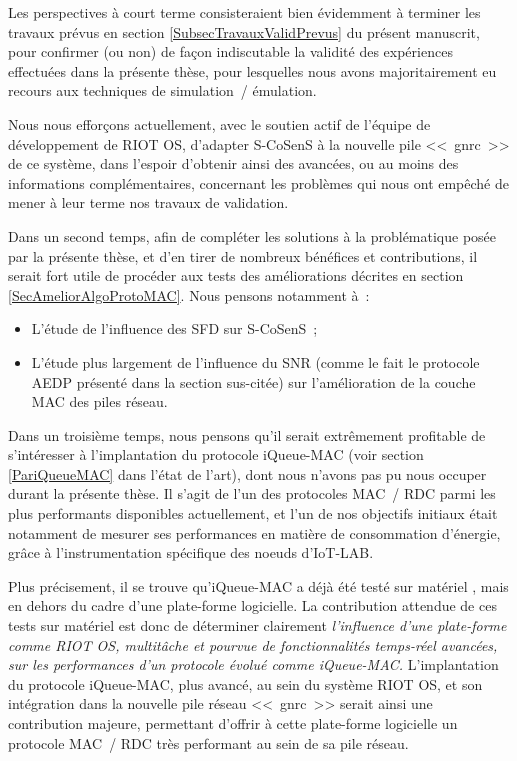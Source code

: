 Les perspectives à court terme consisteraient bien évidemment à terminer
les travaux prévus en section \vref{SubsecTravauxValidPrevus} du présent
manuscrit, pour confirmer (ou non) de façon indiscutable la validité des
expériences effectuées dans la présente thèse, pour lesquelles nous avons
majoritairement eu recours aux techniques de simulation~/ émulation.

Nous nous efforçons actuellement, avec le soutien actif de l'équipe de
développement de RIOT OS, d'adapter S-CoSenS à la nouvelle pile <<~gnrc~>>
de ce système, dans l'espoir d'obtenir ainsi des avancées, ou au moins
des informations complémentaires, concernant les problèmes qui nous ont
empêché de mener à leur terme nos travaux de validation.

\medskip

Dans un second temps, afin de compléter les solutions à la problématique
posée par la présente thèse, et d'en tirer de nombreux bénéfices et
contributions, il serait fort utile de procéder aux tests des améliorations
décrites en section \vref{SecAmeliorAlgoProtoMAC}. Nous pensons notamment à~:

\begin{itemize}

\item L'étude de l'influence des SFD sur S-CoSenS~;

\item L'étude plus largement de l'influence du SNR (comme le fait le
protocole AEDP présenté dans la section sus-citée) sur l'amélioration
de la couche MAC des piles réseau.

\end{itemize}

\medskip

Dans un troisième temps, nous pensons qu'il serait extrêmement profitable
de s'intéresser à l'implantation du protocole iQueue-MAC (voir section
\vref{PariQueueMAC} dans l'état de l'art), dont nous n'avons pas pu nous
occuper durant la présente thèse. Il s'agit de l'un des protocoles MAC~/
RDC parmi les plus performants disponibles actuellement, et l'un de nos
objectifs initiaux était notamment de mesurer ses performances en matière
de consommation d'énergie, grâce à l'instrumentation spécifique des noeuds
d'IoT-LAB.

Plus précisement, il se trouve qu'iQueue-MAC a déjà été testé sur
matériel \cite{iQueueMAC}, mais en dehors du cadre d'une plate-forme
logicielle. La contribution attendue de ces tests sur matériel est donc
de déterminer clairement \emph{l'influence d'une plate-forme comme RIOT OS,
multitâche et pourvue de fonctionnalités temps-réel avancées, sur les
performances d'un protocole évolué comme iQueue-MAC.}
L'implantation du protocole iQueue-MAC, plus avancé, au sein du système
RIOT OS, et son intégration dans la nouvelle pile réseau <<~gnrc~>> serait
ainsi une contribution majeure, permettant d'offrir à cette plate-forme
logicielle un protocole MAC~/ RDC très performant au sein de sa pile réseau.

